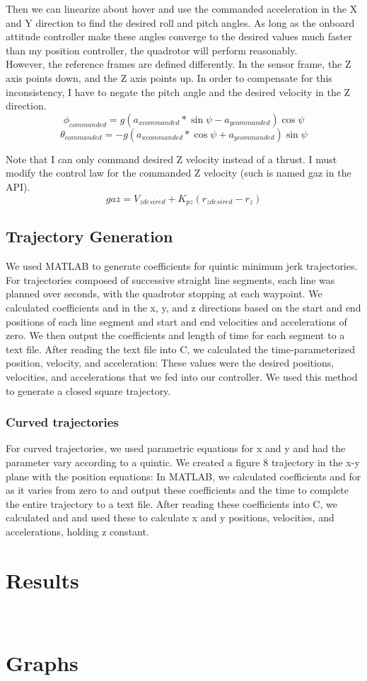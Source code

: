 \documentclass[english, twocolumn]{article}
\begin{document}
Then we can linearize about hover and use the commanded acceleration in the X and Y direction to find the desired roll and pitch angles. As long as the onboard attitude controller make these angles converge to the desired values much faster than my position controller, the quadrotor will perform reasonably.\\

However, the reference frames are defined differently. In the sensor frame, the Z axis points down, and the Z axis points up. In order to compensate for this inconsistency, I have to negate the pitch angle and the desired velocity in the Z direction.
$$
\phi_{commanded} = g(a_{x commanded}*\sin\psi - a_{y commanded})\cos\psi
$$
$$\theta_{commanded} = -g(a_{x commanded}*\cos\psi + a_{y commanded})\sin\psi$$


Note that I can only command desired Z velocity instead of a thrust. I must modify the control law for the commanded Z velocity (such is named gaz in the API).
\begin{equation}
gaz = V_{z desired} + K_{pz}(r_{z desired} - r_z)
\end{equation}

\subsection*{Trajectory Generation}
We used MATLAB to generate coefficients for quintic minimum jerk trajectories. For 
trajectories composed of successive straight line segments, each line was planned over  
seconds, with the quadrotor stopping at each waypoint.  We calculated coefficients  and  
in the x, y, and z directions based on the start and end positions of each line segment and 
start and end velocities and accelerations of zero. We then output the coefficients and 
length of time for each segment to a text file. After reading the text file into C, we 
calculated the time-parameterized position, velocity, and acceleration: 
These values were the desired positions, velocities, and accelerations that we fed into our 
controller. We used this method to generate a closed square trajectory. 

\subsubsection*{Curved trajectories}
For curved trajectories, we used parametric equations for x and y and had the parameter  
vary according to a quintic. We created a figure 8 trajectory in the x-y plane with the 
position equations: 
In MATLAB, we calculated coefficients  and  for  as it varies from zero to  and output 
these coefficients and the time to complete the entire trajectory to a text file. After 
reading these coefficients into C, we calculated  and and used these to calculate x and y 
positions, velocities, and accelerations, holding z constant.
\section*{Results} 

\section{\\Graphs} \label{App:AppendixA}
\end{document}
